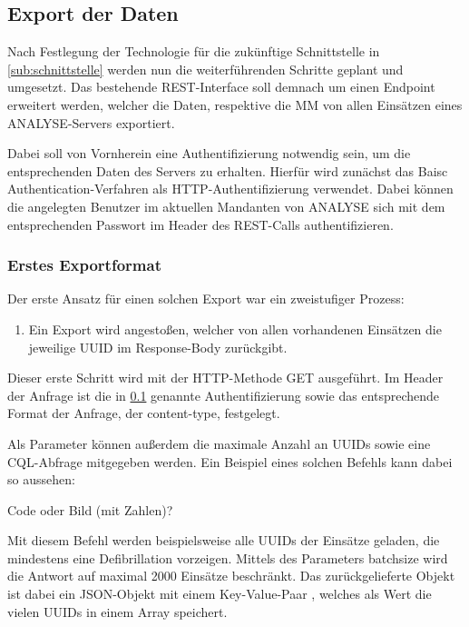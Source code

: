 \subsection{Export der Daten} %
\label{sub:export}
Nach Festlegung der Technologie für die zukünftige Schnittstelle in \ref{sub:schnittstelle} werden nun die weiterführenden Schritte geplant und umgesetzt.
Das bestehende \gls{REST}-Interface soll demnach um einen Endpoint erweitert werden, welcher die Daten, respektive die \gls{MM} von allen Einsätzen eines \gls{ANALYSE}-Servers exportiert.

Dabei soll von Vornherein eine Authentifizierung notwendig sein, um die entsprechenden Daten des Servers zu erhalten.
Hierfür wird zunächst das \glqq Baisc Authentication\grqq-Verfahren als HTTP-Authentifizierung verwendet. 
Dabei können die angelegten Benutzer im aktuellen Mandanten von \gls{ANALYSE} sich mit dem entsprechenden Passwort im Header des \gls{REST}-Calls authentifizieren.

\subsubsection{Erstes Exportformat}
\label{subsub:1stexport}
Der erste Ansatz für einen solchen Export war ein zweistufiger Prozess:
\begin{enumerate}
\item Ein Export wird angestoßen, welcher von allen vorhandenen Einsätzen die jeweilige \gls{UUID} im Response-Body zurückgibt.
\end{enumerate}

Dieser erste Schritt wird mit der HTTP-Methode \glqq GET\grqq{} ausgeführt.
Im Header der Anfrage ist die in \ref{sub:export} genannte Authentifizierung sowie das entsprechende Format der Anfrage, der \glqq content-type\grqq, festgelegt.

Als Parameter können außerdem die maximale Anzahl an UUIDs sowie eine \gls{CQL}-Abfrage mitgegeben werden.
Ein Beispiel eines solchen Befehls kann dabei so aussehen:

Code oder Bild (mit Zahlen)?

Mit diesem Befehl werden beispielsweise alle UUIDs der Einsätze geladen, die mindestens eine Defibrillation vorzeigen. 
Mittels des Parameters \glqq batchsize\grqq{} wird die Antwort auf maximal 2000 Einsätze beschränkt.
Das zurückgelieferte Objekt ist dabei ein JSON-Objekt mit einem Key-Value-Paar , welches als Wert die vielen \gls{UUID}s in einem Array speichert.

